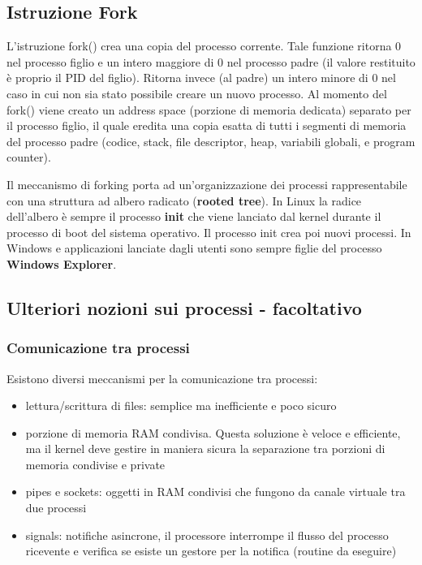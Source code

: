 \subsection{Istruzione Fork}
L'istruzione fork() crea una copia del processo corrente. Tale funzione ritorna 0 nel processo figlio e un intero maggiore di 0 nel processo padre (il valore restituito è proprio il PID del figlio). Ritorna invece (al padre) un intero minore di 0 nel caso in cui non sia stato possibile creare un nuovo processo. Al momento del fork() viene creato un address space (porzione di memoria dedicata) separato per il processo figlio, il quale eredita una copia esatta di tutti i segmenti di memoria del processo padre (codice, stack, file descriptor, heap, variabili globali, e program counter).\newline

Il meccanismo di forking porta ad un'organizzazione dei processi rappresentabile con una struttura ad albero radicato (\textbf{rooted tree}). In Linux la radice dell'albero è sempre il processo \textbf{init} che viene lanciato dal kernel durante il processo di boot del sistema operativo. Il processo init crea poi nuovi processi. In Windows e applicazioni lanciate dagli utenti sono sempre figlie del processo \textbf{Windows Explorer}.

\subsection{Ulteriori nozioni sui processi - facoltativo}
\subsubsection{Comunicazione tra processi}
Esistono diversi meccanismi per la comunicazione tra processi:
\begin{itemize}
  \item lettura/scrittura di files: semplice ma inefficiente e poco sicuro
  \item porzione di memoria RAM condivisa. Questa soluzione è veloce e efficiente, ma il kernel deve gestire in maniera sicura la separazione tra porzioni di memoria condivise e private
  \item pipes e sockets: oggetti in RAM condivisi che fungono da canale virtuale tra due processi
  \item signals: notifiche asincrone, il processore interrompe il flusso del processo ricevente e verifica se esiste un gestore per la notifica (routine da eseguire)
\end{itemize}


